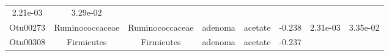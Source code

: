 \documentclass[11pt,]{article}
\begin{document}
\begin{longtable}[]{@{}cccccccc@{}}
\begin{minipage}[t]{0.08\columnwidth}
2.21e-03\strut
\end{minipage} & \begin{minipage}[t]{0.08\columnwidth}\centering\strut
3.29e-02\strut
\end{minipage}\tabularnewline
\begin{minipage}[t]{0.08\columnwidth}\centering\strut
Otu00273\strut
\end{minipage} & \begin{minipage}[t]{0.15\columnwidth}\centering\strut
Ruminococcaceae\strut
\end{minipage} & \begin{minipage}[t]{0.15\columnwidth}\centering\strut
Ruminococcaceae\strut
\end{minipage} & \begin{minipage}[t]{0.08\columnwidth}\centering\strut
adenoma\strut
\end{minipage} & \begin{minipage}[t]{0.09\columnwidth}\centering\strut
acetate\strut
\end{minipage} & \begin{minipage}[t]{0.07\columnwidth}\centering\strut
-0.238\strut
\end{minipage} & \begin{minipage}[t]{0.08\columnwidth}\centering\strut
2.31e-03\strut
\end{minipage} & \begin{minipage}[t]{0.08\columnwidth}\centering\strut
3.35e-02\strut
\end{minipage}\tabularnewline
\begin{minipage}[t]{0.08\columnwidth}\centering\strut
Otu00308\strut
\end{minipage} & \begin{minipage}[t]{0.15\columnwidth}\centering\strut
Firmicutes\strut
\end{minipage} & \begin{minipage}[t]{0.15\columnwidth}\centering\strut
Firmicutes\strut
\end{minipage} & \begin{minipage}[t]{0.08\columnwidth}\centering\strut
adenoma\strut
\end{minipage} & \begin{minipage}[t]{0.09\columnwidth}\centering\strut
acetate\strut
\end{minipage} & \begin{minipage}[t]{0.07\columnwidth}\centering\strut
-0.237\strut
\end{minipage} & \begin{minipage}[t]{0.08\columnwidth}\centering\strut

\end{minipage}
\end{longtable}
\end{document}
